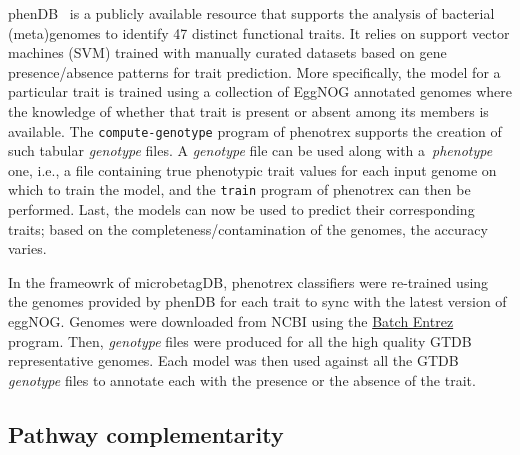 \documentclass[sn-mathphys,Numbered, lineno]{sn-jnl}  %
\theoremstyle{thmstyleone}%
\theoremstyle{thmstyletwo}%
\theoremstyle{thmstylethree}%
\begin{document}
        phenDB~\cite{feldbauer2015prediction} is a publicly available resource that supports the analysis of bacterial (meta)genomes to identify 47 distinct functional traits. 
        It relies on support vector machines (SVM) trained with manually curated datasets based on gene presence/absence patterns for trait prediction.
        More specifically, the model for a particular trait is trained using a collection of EggNOG annotated genomes where the knowledge of whether that trait is present or absent among its members is available.
        The \texttt{compute-genotype} program of phenotrex supports the creation of such tabular \textit{genotype} files.
        A \textit{genotype} file can be used along with a~\textit{phenotype} one, i.e., a file containing true phenotypic trait values for each input genome on which to train the model, and the \texttt{train} program of phenotrex can then be performed. 
        Last, the models can now be used to predict their corresponding traits; based on the completeness/contamination of the genomes, the accuracy varies. 
        
        In the frameowrk of microbetagDB, phenotrex classifiers were re-trained using the genomes provided by phenDB for each trait to sync with the latest version of eggNOG. 
        Genomes were downloaded from NCBI using the \href{https://www.ncbi.nlm.nih.gov/sites/batchentrez}{Batch Entrez} program.
        Then, \textit{genotype} files were produced for all the high quality GTDB representative genomes.
        Each model was then used against all the GTDB \textit{genotype} files to annotate each with the presence or the absence of the trait. 




    \subsection*{ Pathway complementarity }
    \label{subsec:path-compl}
\end{document}
